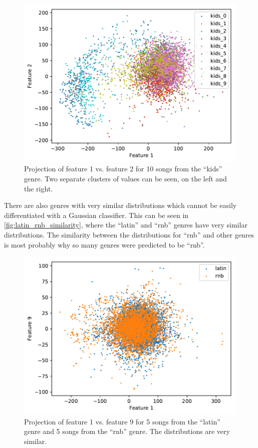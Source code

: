 \documentclass[a4paper,titlepage]{article}
\begin{document}
	\begin{figure}[!htb]
		\centering
		\includegraphics[width=\columnwidth]{plots/kids_cluster.pdf}
		\caption
		{Projection of feature 1 vs. feature 2 for 10 songs from the ``kids'' genre. Two separate clusters of values can be seen, on the left and the right.}
		\label{fig:kids_cluster}
	\end{figure}

	There are also genres with very similar distributions which cannot be easily differentiated with a Gaussian classifier. This can be seen in \autoref{fig:latin_rnb_similarity}, where the ``latin'' and ``rnb'' genres have very similar distributions. The similarity between the distributions for ``rnb'' and other genres is most probably why so many genres were predicted to be ``rnb''.
	
	\begin{figure}[!htb]
		\centering
		\includegraphics[width=\columnwidth]{plots/latin_rnb_similarity.pdf}
		\caption
		{Projection of feature 1 vs. feature 9 for 5 songs from the ``latin'' genre and 5 songs from the ``rnb'' genre. The distributions are very similar.}
		\label{fig:latin_rnb_similarity}
	\end{figure}
	
\end{document}
